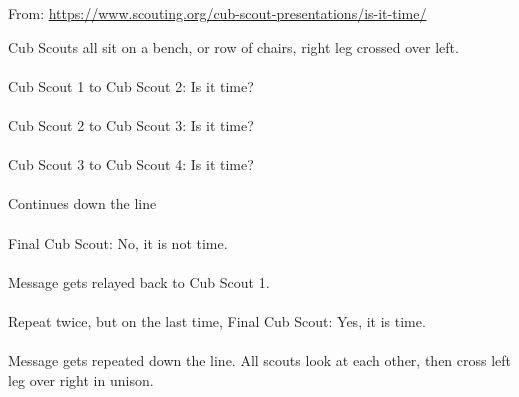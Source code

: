 
From: \url{https://www.scouting.org/cub-scout-presentations/is-it-time/}

Cub Scouts all sit on a bench, or row of chairs, right leg crossed over left.\\
\\
Cub Scout 1 to Cub Scout 2: Is it time?\\
\\
Cub Scout 2 to Cub Scout 3: Is it time?\\
\\
Cub Scout 3 to Cub Scout 4: Is it time?\\
\\
Continues down the line\\
\\
Final Cub Scout: No, it is not time.\\
\\
Message gets relayed back to Cub Scout 1.\\
\\
Repeat twice, but on the last time, Final Cub Scout: Yes, it is time.\\
\\
Message gets repeated down the line. All scouts look at each other, then cross left leg over right in unison.\\
